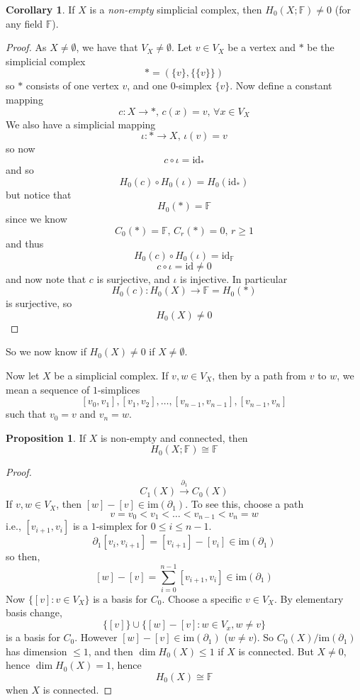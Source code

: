 \documentclass[a4paper,14pt]{extarticle}
\theoremstyle{definition}
\newtheorem*{corollary}{Corollary}
\newtheorem*{proposition}{Proposition}
\begin{document}
\begin{corollary}
If $X$ is a \emph{non-empty} simplicial complex, then $H_0(X;\mathbb{F})\neq0$ (for any field $\mathbb{F}$).
\end{corollary}

\begin{proof}
	As $X\neq\emptyset$, we have that $V_X\neq\emptyset$. Let $v\in V_X$ be a vertex and $*$ be the simplicial complex \[*=(\{v\},\{\{v\}\})\] so $*$ consists of one vertex
	$v$, and one $0$-simplex $\{v\}$. Now define a constant mapping \[c:X\rightarrow *, \,c(x)=v,\,\forall x\in V_X\] We also have a simplicial mapping 
	\[\iota:*\rightarrow X, \,\iota(v)=v\] so now \[c\circ\iota=\text{id}_*\] and so \[H_0(c)\circ H_0(\iota)=H_0(\text{id}_*)\] but notice that \[H_0(*)=\mathbb{F}\] since we know
	\[C_0(*)=\mathbb{F}, \,C_r(*)=0,\,r\geq1\] and thus \[H_0(c)\circ H_0(\iota)=\text{id}_\mathbb{F}\] \[c\circ\iota=\text{id}\neq0\] and now note that $c$ is surjective,
	and $\iota$ is injective. In particular \[H_0(c):H_0(X)\rightarrow\mathbb{F}=H_0(*)\] is surjective, so \[H_0(X)\neq0\]
\end{proof}

\noindent So we now know if $H_0(X)\neq0$ if $X\neq\emptyset$.

\vspace{12pt}

Now let $X$ be a simplicial complex. If $v,w\in V_X$, then by a path from $v$ to $w$, we mean
a sequence of $1$-simplices \[[v_0,v_1],[v_1,v_2],\ldots,[v_{n-1},v_{n-1}],[v_{n-1},v_n]\]
such that $v_0=v$ and $v_n=w$.

\begin{proposition}
	If $X$ is non-empty and connected, then \[H_0(X;\mathbb{F})\cong\mathbb{F}\]
\end{proposition}

\begin{proof}
	\[C_1(X)\xrightarrow{\partial_1} C_0(X)\]
	If $v,w\in V_X$, then $[w]-[v]\in\text{im}(\partial_1)$. To see this, choose a path
	\[v=v_0<v_1<\ldots<v_{n-1}<v_n=w\] i.e., $[v_{i+1},v_i]$ is a $1$-simplex for
	$0\leq i\leq n-1$. \[\partial_1[v_i,v_{i+1}]=[v_{i+1}]-[v_i]\in\text{im}(\partial_1)\]
	so then, \[[w]-[v]=\sum_{i=0}^{n-1}[v_{i+1},v_i]\in\text{im}(\partial_1)\]
	Now $\{[v]:v\in V_X\}$ is a basis for $C_0$. Choose a specific $v\in V_X$. By elementary
	basis change, \[\{[v]\}\cup\{[w]-[v]:w\in V_x,w\neq v\}\] is a basis for $C_0$.
	However $[w]-[v]\in\text{im}(\partial_1)$ ($w\neq v$). So $C_0(X)/\text{im}(\partial_1)$ has
	dimension $\leq 1$, and then $\dim H_0(X)\leq 1$ if $X$ is connected. But $X\neq0$, hence
	$\dim H_0(X)=1$, hence \[H_0(X)\cong \mathbb{F}\] when $X$ is connected.
\end{proof}
\end{document}
